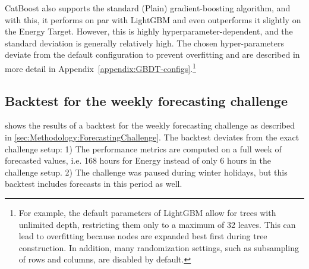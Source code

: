 CatBoost also supports the standard (Plain) gradient-boosting algorithm,
and with this, it performs on par with LightGBM and even outperforms it slightly on
the Energy Target. However, this is highly hyperparameter-dependent, and the standard
deviation is generally relatively high. The chosen hyper-parameters deviate from the default 
configuration to prevent overfitting and are described in more detail in Appendix~\ref{appendix:GBDT-configs}.\footnote{For example, the default parameters of LightGBM allow for trees with unlimited depth, restricting them only to a maximum of 32 leaves. This can lead to overfitting because nodes are expanded best first during tree construction. In addition, many randomization settings, such as subsampling of rows and columns, are disabled by default.}


\subsection{Backtest for the weekly forecasting challenge}
\label{sec:Results:Backtest}

 shows the results of a backtest for the weekly forecasting challenge as described in \cref{sec:Methodology:ForecastingChallenge}. The backtest deviates from the exact challenge setup: 1) The performance metrics are computed on a full week of forecasted values, i.e. 168 hours for Energy instead of only 6 hours in the challenge setup. 2) The challenge was paused during winter holidays, but this backtest includes forecasts in this period as well.

